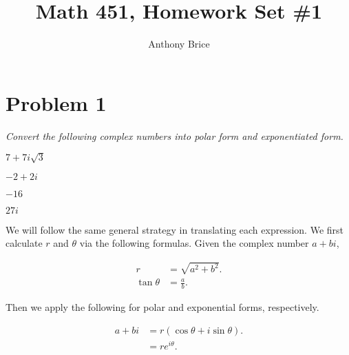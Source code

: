 \documentclass{tufte-handout}
\title{Math 451, Homework Set \#1}
\author{Anthony Brice}
\begin{document}
\maketitle

\section{Problem 1}

\begin{description}
\item \textit{Convert the following complex numbers into polar form
    and exponentiated form.}
\item[(a)] $7 + 7i\sqrt{3}$
\item[(b)] $-2 + 2i$
\item[(c)] $-16$
\item[(d)] $27i$
\end{description}

We will follow the same general strategy in translating each
expression. We first calculate $r$ and $\theta$ via the following
formulas. Given the complex number $a + bi$,

\begin{align*}
  r &= \sqrt{a^2 + b^2}.\\
  \tan \theta &= \frac{a}{b}.
\end{align*}

Then we apply the following for polar and exponential forms, respectively.

\begin{align*}
  a + bi &= r \left( \cos \theta + i \sin \theta \right).\\
         &= r e^{i \theta}.
\end{align*}
\end{document}
